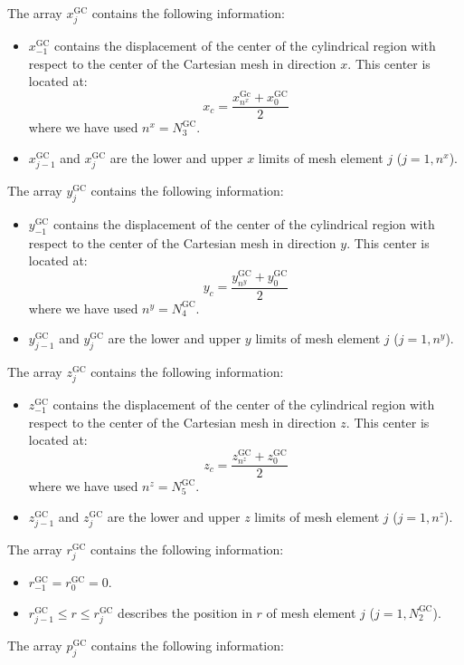 The array $x^{\text{GC}}_{j}$ contains the following information:
\begin{itemize}
\item $x^{\text{GC}}_{-1}$ contains the displacement of the center of the cylindrical region with respect to the center of the Cartesian mesh in direction $x$. This
center is located at:
$$
x_{c}=\frac{x^{\text{Gc}}_{n^{x}}+x^{\text{GC}}_{0}}{2}
$$
where we have used $n^{x}=N^{\text{GC}}_{3}$.
\item $x^{\text{GC}}_{j-1}$ and $x^{\text{GC}}_{j}$ are the lower and upper $x$ limits of mesh element $j$ ($j=1,n^{x}$).
\end{itemize}
The array $y^{\text{GC}}_{j}$ contains the following information:
\begin{itemize}
\item $y^{\text{GC}}_{-1}$ contains the displacement of the center of the cylindrical region with respect to the center of the Cartesian mesh in direction $y$. This
center is located at:
$$
y_{c}=\frac{y^{\text{GC}}_{n^{y}}+y^{\text{GC}}_{0}}{2}
$$
where we have used $n^{y}=N^{\text{GC}}_{4}$.
\item $y^{\text{GC}}_{j-1}$ and $y^{\text{GC}}_{j}$ are the lower and upper $y$ limits of mesh element $j$ ($j=1,n^{y}$).
\end{itemize}
The array $z^{\text{GC}}_{j}$ contains the following information:
\begin{itemize}
\item $z^{\text{GC}}_{-1}$ contains the displacement of the center of the cylindrical region with respect to the center of the Cartesian mesh in direction $z$. This
center is located at:
$$
z_{c}=\frac{z^{\text{GC}}_{n^{z}}+z^{\text{GC}}_{0}}{2}
$$
where we have used $n^{z}=N^{\text{GC}}_{5}$.
\item $z^{\text{GC}}_{j-1}$ and $z^{\text{GC}}_{j}$ are the lower and upper $z$ limits of mesh element $j$ ($j=1,n^{z}$).
\end{itemize}
  The array $r^{\text{GC}}_{j}$ contains the following information:
\begin{itemize}
\item $r^{\text{GC}}_{-1}=r^{\text{GC}}_{0}=0$. 
\item $r^{\text{GC}}_{j-1}\le r\le r^{\text{GC}}_{j}$ describes the position in $r$ of mesh element $j$ ($j=1,N^{\text{GC}}_{2}$). 
\end{itemize}
The array $p^{\text{GC}}_{j}$ contains the following information:
